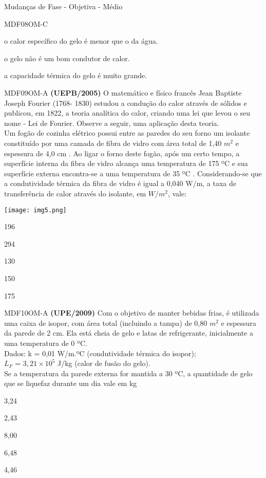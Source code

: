 \documentclass[12pt]{article}
\begin{document}
\begin{quiz}{Mudanças de Fase - Objetiva - Médio}
\begin{multi}[points=1,penalty=0]{MDF08OM-C}
			\item o calor específico do gelo é menor que o da água.
			\item* o gelo não é um bom condutor de calor.
			\item a capacidade térmica do gelo é muito grande.
		\end{multi}
		\begin{multi}[points=1,penalty=0]{MDF09OM-A}
			\textbf{(UEPB/2005)} O matemático e físico francês Jean Baptiste Joseph Fourier (1768- 1830) estudou a condução do calor através de sólidos e publicou, em 1822, a teoria analítica do calor, criando uma lei que levou o seu nome - Lei de Fourier. Observe a seguir, uma aplicação desta teoria.\\
			Um fogão de cozinha elétrico possui entre as paredes do seu forno um isolante constituído por uma camada de fibra de vidro com área total de 1,40 $m^{2}$ e espessura de 4,0 cm . Ao ligar o forno deste fogão, após um certo tempo, a superfície interna da fibra de vidro alcança uma temperatura de 175 ºC e sua superfície externa encontra-se a uma temperatura de 35 ºC . Considerando-se que a condutividade térmica da fibra de vidro é igual a 0,040 W/m, a taxa de transferência de calor através do isolante, em $W/m^{2}$, vale:
			\begin{center}
				\texttt{[image: img5.png]}		
			\end{center}											
			\item* 196 
			\item 294 
			\item 130
			\item 150 
			\item 175 
		\end{multi}
		\begin{multi}[points=1,penalty=0]{MDF10OM-A}
			\textbf{(UPE/2009)} Com o objetivo de manter bebidas frias, é utilizada uma caixa de isopor, com área total (incluindo a tampa) de 0,80 $m^{2}$ e espessura da parede de 2 cm. Ela está cheia de gelo e latas de refrigerante, inicialmente a uma temperatura de 0 ºC.\\			
			Dados: k = 0,01 W/m.ºC (condutividade térmica do isopor);\\
			$L_{F}$ = $3,21\times10^{5}$ J/kg (calor de fusão do gelo).\\			
			Se a temperatura da parede externa for mantida a 30 ºC, a quantidade de gelo que se liquefaz durante um dia vale em kg													
			\item* 3,24 
			\item 2,43 
			\item 8,00 
			\item 6,48 
			\item 4,46
		\end{multi}										
	\end{quiz}
\end{document}
